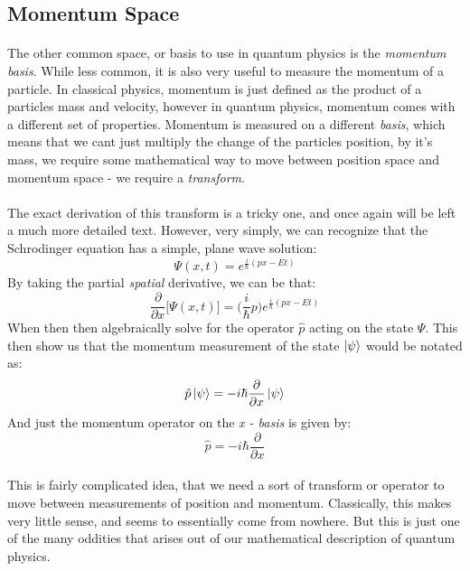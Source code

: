 \documentclass[12pt,letterpaper]{book}
\begin{document}

\subsection*{Momentum Space}
\paragraph*{}The other common space, or basis to use in quantum physics is the \textit{momentum basis}. While less common, it is also very useful to measure the momentum of a particle. In classical physics, momentum is just defined as the product of a particles mass and velocity,  however in quantum physics, momentum comes with a different set of properties. Momentum is measured on a different \textit{basis}, which means that we cant just multiply the change of the particles position, by it's mass, we require some mathematical way to move between position space and momentum space - we require a \textit{transform}.
\paragraph*{}The exact derivation of this transform is a tricky one, and once again will be left a much more detailed text. However, very simply, we can recognize that the Schrodinger equation has a simple, plane wave solution:
\begin{equation}
\label{plane wave sol}
\Psi(x,t) = e^{\frac{i}{\hbar}(px - Et)}
\end{equation} 
By taking the partial \textit{spatial} derivative, we can be that:
\begin{equation}
\frac{\partial}{\partial x}\Big[ \Psi(x,t) \Big] = \big( \frac{i}{\hbar}p\big) e^{\frac{i}{\hbar}(px - Et)}
\end{equation}
When then then algebraically solve for the operator $\hat{p}$ acting on the state $\Psi$. This then show us that the momentum measurement of the state $\ket{\psi}$ would be notated as:
\begin{equation}
\label{momentum on psi}
\hat{p}\ket{\psi} = -i\hbar\frac{\partial}{\partial x}\ket{\psi}
\end{equation}
And just the momentum operator on the \textit{x - basis} is given by:
\begin{equation}
\label{momentum}
\hat{p} = -i\hbar\frac{\partial}{\partial x}
\end{equation}
\paragraph*{}This is fairly complicated idea, that we need a sort of transform or operator to move between measurements of position and momentum. Classically, this makes very little sense, and seems to essentially come from nowhere. But this is just one of the many oddities that arises out of our mathematical description of quantum physics. 
\end{document}
